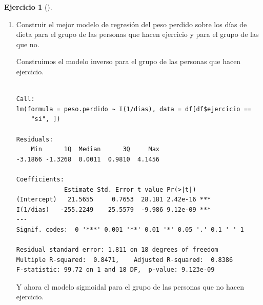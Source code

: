 \documentclass[
  a4paper,
]{scrreport}
\newenvironment{Shaded}{\begin{snugshade}}{\end{snugshade}}
\newcommand{\DecValTok}[1]{\textcolor[rgb]{0.68,0.00,0.00}{#1}}
\newcommand{\FunctionTok}[1]{\textcolor[rgb]{0.28,0.35,0.67}{#1}}
\newcommand{\NormalTok}[1]{\textcolor[rgb]{0.00,0.23,0.31}{#1}}
\newcommand{\OtherTok}[1]{\textcolor[rgb]{0.00,0.23,0.31}{#1}}
\newcommand{\SpecialCharTok}[1]{\textcolor[rgb]{0.37,0.37,0.37}{#1}}
\newcommand{\StringTok}[1]{\textcolor[rgb]{0.13,0.47,0.30}{#1}}
\theoremstyle{definition}
\newtheorem{exercise}{Ejercicio}[chapter]
\theoremstyle{remark}
\begin{document}
\begin{exercise}[]
\begin{enumerate}
\begin{tcolorbox}
  \end{tcolorbox}
\item
  Construir el mejor modelo de regresión del peso perdido sobre los días
  de dieta para el grupo de las personas que hacen ejercicio y para el
  grupo de las que no.

  \begin{tcolorbox}[enhanced jigsaw, coltitle=black, left=2mm, colback=white, leftrule=.75mm, toptitle=1mm, breakable, bottomrule=.15mm, titlerule=0mm, bottomtitle=1mm, title=\textcolor{quarto-callout-tip-color}{\faLightbulb}\hspace{0.5em}{Solución}, arc=.35mm, toprule=.15mm, rightrule=.15mm, colframe=quarto-callout-tip-color-frame, opacityback=0, colbacktitle=quarto-callout-tip-color!10!white, opacitybacktitle=0.6]

  Construimos el modelo inverso para el grupo de las personas que hacen
  ejercicio.

\begin{Shaded}
\end{Shaded}

\begin{verbatim}

Call:
lm(formula = peso.perdido ~ I(1/dias), data = df[df$ejercicio == 
    "si", ])

Residuals:
    Min      1Q  Median      3Q     Max 
-3.1866 -1.3268  0.0011  0.9810  4.1456 

Coefficients:
             Estimate Std. Error t value Pr(>|t|)    
(Intercept)   21.5655     0.7653  28.181 2.42e-16 ***
I(1/dias)   -255.2249    25.5579  -9.986 9.12e-09 ***
---
Signif. codes:  0 '***' 0.001 '**' 0.01 '*' 0.05 '.' 0.1 ' ' 1

Residual standard error: 1.811 on 18 degrees of freedom
Multiple R-squared:  0.8471,    Adjusted R-squared:  0.8386 
F-statistic: 99.72 on 1 and 18 DF,  p-value: 9.123e-09
\end{verbatim}

  Y ahora el modelo sigmoidal para el grupo de las personas que no hacen
  ejercicio.


\end{tcolorbox}
\end{enumerate}
\end{exercise}
\end{document}
